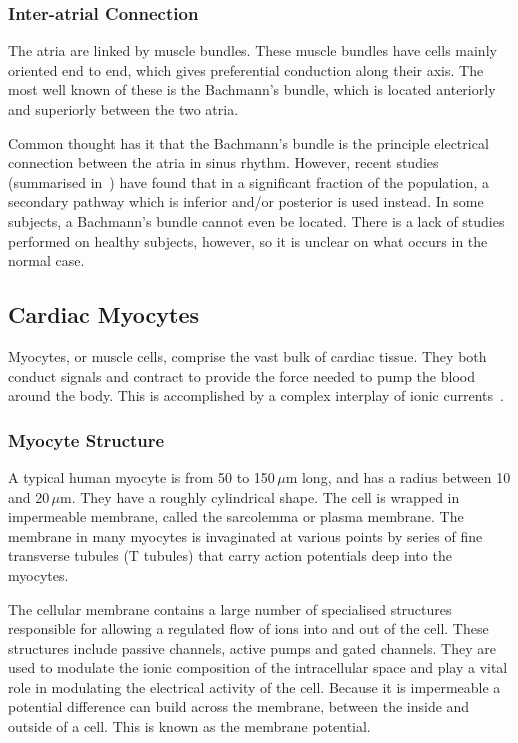 \subsubsection{Inter-atrial Connection}

The atria are linked by muscle bundles.
These muscle bundles have cells mainly oriented end to end, which gives
preferential conduction along their axis.
The most well known of these is the Bachmann's bundle, which is located
anteriorly and superiorly between the two atria.

Common thought has it that the Bachmann's bundle is the principle electrical
connection between the atria in sinus rhythm.
However, recent studies (summarised in~\cite{Platonov2007,Platonov2008a}) have
found that in a significant fraction of the population, a secondary pathway
which is inferior and/or posterior is used instead.
In some subjects, a Bachmann's bundle cannot even be located.
There is a lack of studies performed on healthy subjects, however, so it is
unclear on what occurs in the normal case.

\subsection{Cardiac Myocytes}

Myocytes, or muscle cells, comprise the vast bulk of cardiac tissue.
They both conduct signals and contract to provide the force needed to pump the
blood around the body.
This is accomplished by a complex interplay of ionic currents~\cite{Katz2006}.

\subsubsection{Myocyte Structure}

A typical human myocyte is from 50 to 150$\,\mu$m long, and has a radius
between 10 and 20$\,\mu$m.
They have a roughly cylindrical shape.
The cell is wrapped in impermeable membrane, called the sarcolemma or plasma
membrane.
The membrane in many myocytes is invaginated at various points by series of
fine transverse tubules (T tubules) that carry action potentials deep into the
myocytes.

The cellular membrane contains a large number of specialised structures
responsible for allowing a regulated flow of ions into and out of the cell.
These structures include passive channels, active pumps and gated channels.
They are used to modulate the ionic composition of the intracellular
space and play a vital role in modulating the electrical activity of the cell.
Because it is impermeable a potential difference can build across the membrane,
between the inside and outside of a cell.
This is known as the membrane potential.

